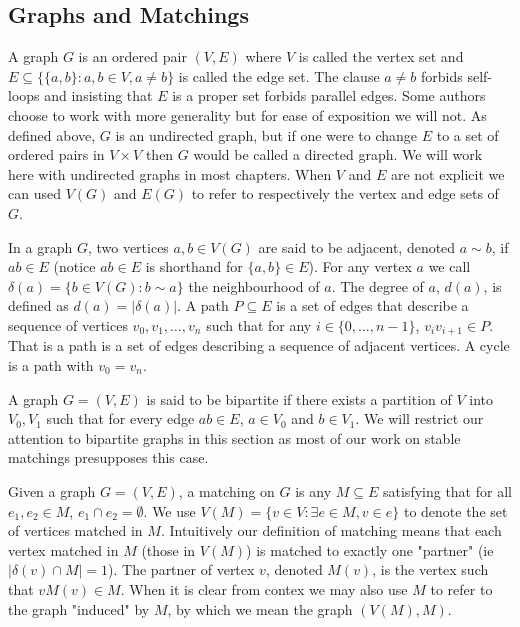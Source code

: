 \subsection{Graphs and Matchings}
\begin{definition} A graph $G$ is an ordered pair $(V,E)$ where $V$ is called the vertex set and $E \subseteq \{\{a,b\} : a,b \in V, a \neq b\}$ is called the edge set. The clause $a \neq b$ forbids self-loops and insisting that $E$ is a proper set forbids parallel edges. Some authors choose to work with more generality but for ease of exposition we will not. As defined above, $G$ is an undirected graph, but if one were to change $E$ to a set of ordered pairs in $V \times V$ then $G$ would be called a directed graph. We will work here with undirected graphs in most chapters. When $V$ and $E$ are not explicit we can used $V(G)$ and $E(G)$ to refer to respectively the vertex and edge sets of $G$.
\end{definition}
\begin{definition} In a graph $G$, two vertices $a,b \in V(G)$ are said to be adjacent, denoted $a \sim b$, if $ab \in E$ (notice $ab \in E$ is shorthand for $\{a,b\} \in E$). For any vertex $a$ we call $\delta(a) = \{b \in V(G): b \sim a\}$ the neighbourhood of $a$. The degree of $a$, $d(a)$, is defined as $d(a) = |\delta(a)|$. A path $P \subseteq E$ is a set of edges that describe a sequence of vertices $v_0, v_1, \dots, v_n$ such that for any $i \in \{0,\dots, n-1\}$, $v_iv_{i+1} \in P$. That is a path is a set of edges describing a sequence of adjacent vertices. A cycle is a path with $v_0 = v_n$.
\end{definition}
\begin{definition} A graph $G = (V,E)$ is said to be bipartite if there exists a partition of $V$ into $V_0, V_1$ such that for every edge $ab \in E$, $a \in V_0$ and $b \in V_1$. We will restrict our attention to bipartite graphs in this section as most of our work on stable matchings presupposes this case.
\end{definition}
\begin{definition} Given a graph $G = (V,E)$, a matching on $G$ is any $M \subseteq E$ satisfying that for all $e_1, e_2 \in M$, $e_1 \cap e_2 = \emptyset$. We use $V(M) = \{v \in V: \exists e \in M, v \in e\}$ to denote the set of vertices matched in $M$. Intuitively our definition of matching means that each vertex matched in $M$ (those in $V(M)$) is matched to exactly one "partner" (ie $|\delta(v) \cap M| = 1$). The partner of vertex $v$, denoted $M(v)$, is the vertex such that $vM(v) \in M$. When it is clear from contex we may also use $M$ to refer to the graph "induced" by $M$, by which we mean the graph $(V(M), M)$.
\end{definition}
